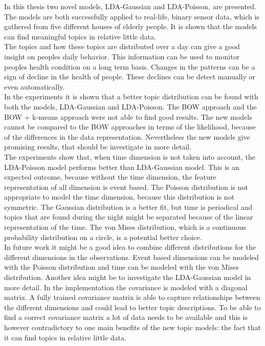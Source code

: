 In this thesis two novel models, LDA-Gaussian and LDA-Poisson, are presented. The models are both successfully applied to real-life, binary  sensor data, which is gathered from five different houses of elderly people. It is shown that the models can find meaningful topics in relative little data.\\

The topics and how these topics are distributed over a day can give a good insight on peoples daily behavior. This information can be used to monitor peoples health condition on a long term basis. Changes in the patterns can be a sign of decline in the health of people. These declines can be detect manually or even automatically.\\

In the experiments it is shown that a better topic distribution can be found with both the models, LDA-Gaussian and LDA-Poisson. The BOW approach and the BOW + k-means approach were not able to find good results. The new models cannot be compared to the BOW approaches in terms of the likelihood, because of the differences in the data representation. Nevertheless the new models give promising results, that should be investigate in more detail.\\

The experiments show that, when time dimension is not taken into account, the LDA-Poisson model performs better than LDA-Gaussian model. This is an expected outcome, because without the time dimension, the feature representation of all dimension is event based. The Poisson distribution is not appropriate to model the time dimension, because this distribution is not symmetric. The Gaussian distribution is a better fit, but time is periodical and topics that are found during the night might be separated because of the linear representation of the time. The von Mises distribution, which is a continuous probability distribution on a circle, is a potential better choice.\\

In future work it might be a good idea to combine different distributions for the different dimensions in the observations. Event based dimensions can be modeled with the Poisson distribution and time can be modeled with the von Mises distribution.
Another idea might be to investigate the LDA-Gaussian model in more detail. In the implementation the covariance is modeled with a diagonal matrix. A fully trained covariance matrix is able to capture relationships between the different dimensions and could lead to better topic descriptions. To be able to find a correct covariance matrix a lot of data needs to be available and this is however contradictory to one main benefits of the new topic models: the fact that it can find topics in relative little data. \\

